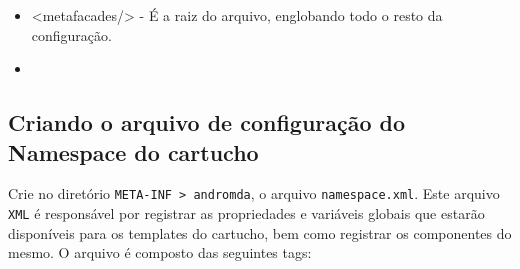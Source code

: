 \begin{enumerate}
\begin{itemize}
  \item <metafacades/> - É a raiz do arquivo, englobando todo o resto da 
  configuração. 
  \item 
\end{itemize}

\subsection{Criando o arquivo de configuração do Namespace do cartucho}
Crie no diretório \texttt{META-INF > andromda}, o arquivo
\texttt{namespace.xml}. Este arquivo \texttt{XML} é responsável por registrar as
propriedades e variáveis globais que estarão disponíveis para os templates do
cartucho, bem como registrar os componentes do mesmo. O arquivo é composto das
seguintes tags:


\end{enumerate}
